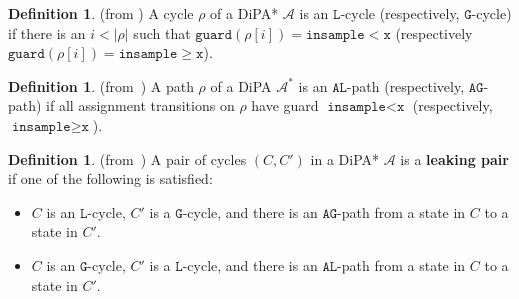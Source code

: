 \documentclass[12pt]{article}
\newcommand{\gguard}{\texttt{insample}\geq \texttt{x}}
\newcommand{\lguard}{\texttt{insample} < \texttt{x}}
\theoremstyle{definition}
\newtheorem{defn}[thm]{Definition}
\begin{document}
\begin{defn} (from \cite{chadhaLinearTimeDecidability2021}) A cycle $\rho$ of a DiPA* $\mathcal{A}$ is an $\texttt{L}$-cycle (respectively, $\texttt{G}$-cycle) if there is an $i < |\rho|$ such that $\texttt{guard}(\rho[i]) = \lguard$ (respectively $\texttt{guard}(\rho[i]) = \gguard$).
\end{defn}

\begin{defn} (from~\cite{chadhaLinearTimeDecidability2021}) A path $\rho$ of a DiPA $\mathcal{A}^*$ is an $\texttt{AL}$-path (respectively, $\texttt{AG}$-path) if all assignment transitions on $\rho$ have guard $\lguard$ (respectively, $\gguard$).
\end{defn}

\begin{defn} (from~\cite{chadhaLinearTimeDecidability2021})	
	A pair of cycles $(C, C')$ in a DiPA* $\mathcal{A}$ is a \textbf{leaking pair} if one of the following is satisfied:
	\begin{itemize}
		\item $C$ is an $\texttt{L}$-cycle, $C'$ is a $\texttt{G}$-cycle, and there is an $\texttt{AG}$-path from a state in $C$ to a state in $C'$.
		\item $C$ is an $\texttt{G}$-cycle, $C'$ is a $\texttt{L}$-cycle, and there is an $\texttt{AL}$-path from a state in $C$ to a state in $C'$.
	\end{itemize}
\end{defn}
\end{document}
